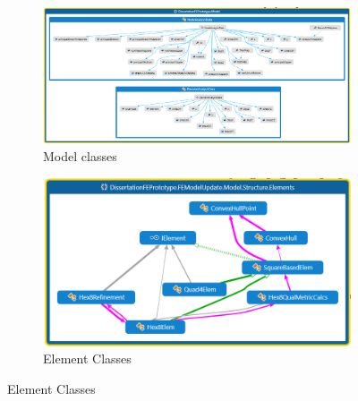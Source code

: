 \begin{figure}[h!]
\centering
\begin{subfigure}{.5\textwidth}
  \centering
  \includegraphics[width=0.9\linewidth]{../Graphics/DataModelStructure/Model.png}
  \caption{Model classes}
  \label{fig:sub1}
\end{subfigure}%
\begin{subfigure}{.5\textwidth}
  \centering
  \includegraphics[width=0.9\linewidth]{../Graphics/DataModelStructure/Elements.png}
  \caption{Element Classes}
  \label{fig:sub2}
\end{subfigure}
\label{fig:test}
\end{figure}

